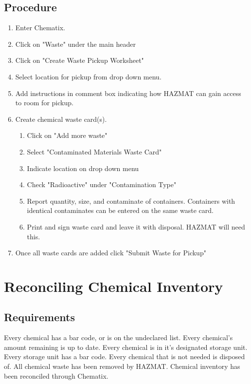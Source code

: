 \documentclass[justified]{tufte-book}
\begin{document}
\subsection{Procedure}
\begin{enumerate}
	\item Enter Chematix.
	\item Click on "Waste" under the main header
	\item Click on "Create Waste Pickup Worksheet"
	\item Select location for pickup from drop down menu.
	\item Add instructions in comment box indicating how HAZMAT can gain access to room for 		pickup.
	\item Create chemical waste card(s).
	\begin{enumerate}
		\item Click on "Add more waste"
		\item Select "Contaminated Materials Waste Card"
		\item Indicate location on drop down menu
		\item Check "Radioactive" under "Contamination Type"
		\item Report quantity, size, and contaminate of containers. Containers with identical 		contaminates can be entered on the same waste card.
		\item Print and sign waste card and leave it with disposal. HAZMAT will need this.
	\end{enumerate}
	\item Once all waste cards are added click "Submit Waste for Pickup" 
\end{enumerate}


\section{\bf Reconciling Chemical Inventory}
\subsection{Requirements}
\begin{itemize}
	\Item Every chemical has a bar code, or is on the undeclared list.
	\Item Every chemical's amount remaining is up to date.
	\Item Every chemical is in it's designated storage unit.
	\Item Every storage unit has a bar code.
	\Item Every chemical that is not needed is disposed of.
	\Item All chemical waste has been removed by HAZMAT.
	\Item Chemical inventory has been reconciled through Chematix.
\end{itemize}
\end{document}
